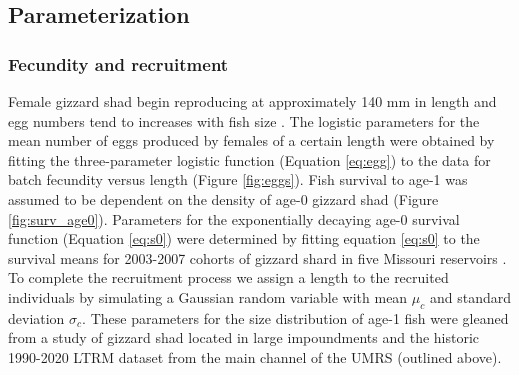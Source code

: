 \documentclass[preprint,review,12pt,authoryear]{elsarticle}
\begin{document}


\subsection{Parameterization}
\subsubsection{Fecundity and recruitment}
Female gizzard shad begin reproducing at approximately 140 mm in length and egg numbers tend to increases with fish size \citep{jons1997ovarian}. 
The logistic parameters for the mean number of eggs produced by females of a certain length were obtained by fitting the three-parameter logistic function (Equation \ref{eq:egg}) to the data for batch fecundity versus length \citep{jons1997ovarian} (Figure \ref{fig:eggs}). 
Fish survival to age-1 was assumed to be dependent on the density of age-0 gizzard shad (Figure \ref{fig:surv_age0}).  
Parameters for the exponentially decaying age-0 survival function (Equation \ref{eq:s0}) were determined by fitting equation \ref{eq:s0} to the survival means for 2003-2007 cohorts of gizzard shard in five Missouri reservoirs \citep{michaletz2010overwinter}.
To complete the recruitment process we assign a length to the recruited individuals by simulating a Gaussian random variable with mean $\mu_c$ and standard deviation $\sigma_c$.
These parameters for the size distribution of age-1 fish were gleaned from a study of gizzard shad located in large impoundments \citep{michaletz2017variation} and the historic 1990-2020 LTRM dataset from the main channel of the UMRS (outlined above).
\end{document}
